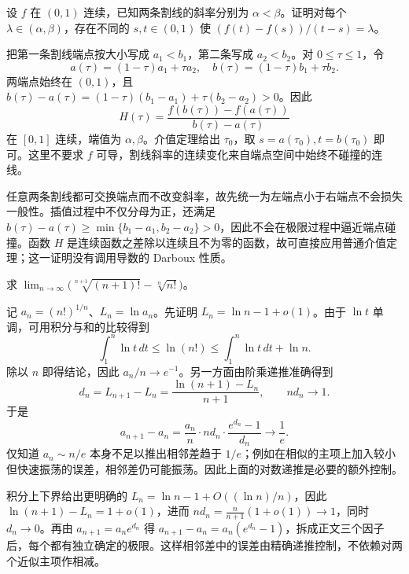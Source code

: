 \documentclass[UTF8,12pt,a4paper,fontset=fandol]{ctexart}
\begin{document}
\begin{example}\label{nm-final9-2}
设 $f$ 在 $(0,1)$ 连续，已知两条割线的斜率分别为 $\alpha<\beta$。证明对每个 $\lambda\in(\alpha,\beta)$，存在不同的 $s,t\in(0,1)$ 使 $(f(t)-f(s))/(t-s)=\lambda$。
\end{example}
\begin{solve}
把第一条割线端点按大小写成 $a_1<b_1$，第二条写成 $a_2<b_2$。对 $0\leq\tau\leq1$，令
\[
 a(\tau)=(1-\tau)a_1+\tau a_2,
 \quad b(\tau)=(1-\tau)b_1+\tau b_2.
\]
两端点始终在 $(0,1)$，且 $b(\tau)-a(\tau)=(1-\tau)(b_1-a_1)+\tau(b_2-a_2)>0$。因此
\[
 H(\tau)=\frac{f(b(\tau))-f(a(\tau))}{b(\tau)-a(\tau)}
\]
在 $[0,1]$ 连续，端值为 $\alpha,\beta$。介值定理给出 $\tau_0$，取 $s=a(\tau_0),t=b(\tau_0)$ 即可。这里不要求 $f$ 可导，割线斜率的连续变化来自端点空间中始终不碰撞的连线。

任意两条割线都可交换端点而不改变斜率，故先统一为左端点小于右端点不会损失一般性。插值过程中不仅分母为正，还满足 $b(\tau)-a(\tau)\ge\min\{b_1-a_1,b_2-a_2\}>0$，因此不会在极限过程中逼近端点碰撞。函数 $H$ 是连续函数之差除以连续且不为零的函数，故可直接应用普通介值定理；这一证明没有调用导数的 Darboux 性质。

\end{solve}

\begin{example}\label{nm-final9-4}
求 $\displaystyle\lim_{n\to\infty}\bigl(\sqrt[n+1]{(n+1)!}-\sqrt[n]{n!}\bigr)$。
\end{example}
\begin{solve}
记 $a_n=(n!)^{1/n}$、$L_n=\ln a_n$。先证明 $L_n=\ln n-1+o(1)$。由于 $\ln t$ 单调，可用积分与和的比较得到
\[
 \int_1^n\ln t\,dt\leq\ln(n!)\leq\int_1^n\ln t\,dt+\ln n.
\]
除以 $n$ 即得结论，因此 $a_n/n\to e^{-1}$。另一方面由阶乘递推准确得到
\[
 d_n=L_{n+1}-L_n=\frac{\ln(n+1)-L_n}{n+1},
 \qquad nd_n\to1.
\]
于是
\[
 a_{n+1}-a_n=\frac{a_n}{n}\cdot n d_n\cdot\frac{e^{d_n}-1}{d_n}
 \longrightarrow\frac1e.
\]
仅知道 $a_n\sim n/e$ 本身不足以推出相邻差趋于 $1/e$；例如在相似的主项上加入较小但快速振荡的误差，相邻差仍可能振荡。因此上面的对数递推是必要的额外控制。

积分上下界给出更明确的 $L_n=\ln n-1+O((\ln n)/n)$，因此 $\ln(n+1)-L_n=1+o(1)$，进而 $nd_n=\frac n{n+1}(1+o(1))\to1$，同时 $d_n\to0$。再由 $a_{n+1}=a_ne^{d_n}$ 得 $a_{n+1}-a_n=a_n(e^{d_n}-1)$，拆成正文三个因子后，每个都有独立确定的极限。这样相邻差中的误差由精确递推控制，不依赖对两个近似主项作相减。

\end{solve}
\end{document}
